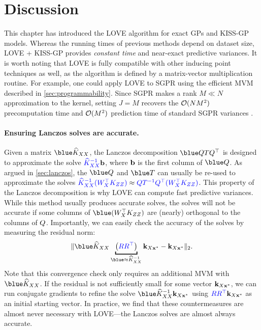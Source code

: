 \section{Discussion}
\label{sec:love_discussion}

This chapter has introduced the LOVE algorithm for exact GPs and KISS-GP models.
Whereas the running times of previous methods depend on dataset size, LOVE{} + KISS-GP provides \emph{constant time} and near-exact predictive variances.
It is worth noting that LOVE is fully compatible with other inducing point techniques as well, as the algorithm is defined by a matrix-vector multiplication routine.
For example, one could apply LOVE to SGPR using the efficient MVM described in \cref{sec:programmability}.
Since SGPR makes a rank $M \ll N$ approximation to the kernel, setting $J\!=\!M$ recovers the $\bigo{NM^{2}}$ precomputation time and $\bigo{M^2}$ prediction time of standard SGPR variances \cite{titsias2009variational}.

\paragraph{Ensuring Lanczos solves are accurate.}
Given a matrix $\blue \trainK$, the Lanczos decomposition $\blue \bQ \bT \bQ^\top$ is designed to approximate the solve ${\color{blue} \widehat{K}_{XX}^{-1}} \mathbf{b}$, where $\mathbf{b}$ is the first column of $\blue \bQ$.
As argued in \cref{sec:lanczos}, the $\blue \bQ$ and $\blue \bT$ can usually be re-used to approximate the solves ${\color{blue} \widehat {K}_{XX}^{-1} (W_{X}^\top K_{ZZ})} \approx {\color{blue} \ensuremath{Q}\ensuremath{T}^{-1} \ensuremath{Q}^\top (\ensuremath{W}_{\ensuremath{X}}^\top \ensuremath{K}_{\ensuremath{Z}\ensuremath{Z}})}$.
This property of the Lanczos decomposition is why LOVE{} can compute fast predictive variances.
While this method usually produces accurate solves, the solves will not be accurate if some columns of $\blue (\bW^\top_{\bX} \bK_{\bZ\bZ})$ are (nearly) orthogonal to the columns of $Q$.
Importantly, we can easily check the accuracy of the solves by measuring the residual norm:
%
\[
  \Vert {\blue \trainK} \underbracket{\left( {\color{blue} \bR \bR^\top} \right)}_{\blue \approx \trainK^{-1}} \bk_{\bX \bxtest} - \bk_{\bX \bxtest} \Vert_2.
\]
%
Note that this convergence check only requires an additional MVM with $\blue \trainK$.
If the residual is not sufficiently small for some vector $\mathbf{k}_{X \mathbf{x}^*}$, we can run conjugate gradients to refine the solve ${\blue \trainK^{-1}} \bk_{\bX \bxtest}$ using ${\color{blue} R R^\top} \mathbf{k}_{X \mathbf{x}^*}$ as an initial starting vector.
In practice, we find that these countermeasures are almost never necessary with LOVE{}---the Lanczos solves are almost always accurate.


